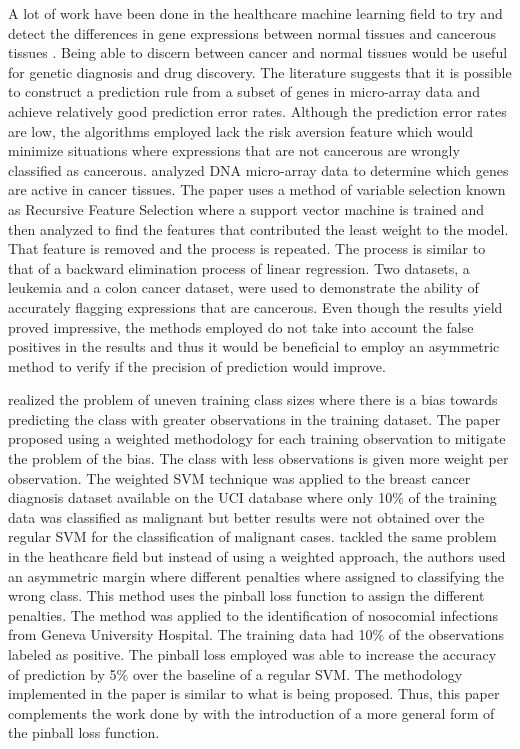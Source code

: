 \documentclass[twoside,11pt]{article}
\begin{document}
A lot of work have been done in the healthcare machine learning field to try and detect the differences in gene expressions between normal tissues and cancerous tissues \citep{Ambroise02}\citep{Guyon02}. Being able to discern between cancer and normal tissues would be useful for genetic diagnosis and drug discovery. The literature suggests that it is possible to construct a prediction rule from a subset of genes in micro-array data and achieve relatively good prediction error rates. Although the prediction error rates are low, the algorithms employed lack the risk aversion feature which would minimize situations where expressions that are not cancerous are wrongly classified as cancerous. \citet{Guyon02} analyzed DNA micro-array data to determine which genes are active in cancer tissues. The paper uses a method of variable selection known as Recursive Feature Selection where a support vector machine is trained and then analyzed to find the features that contributed the least weight to the model. That feature is removed and the process is repeated. The process is similar to that of a backward elimination process of linear regression. Two datasets, a leukemia and a colon cancer dataset, were used to demonstrate the ability of accurately flagging expressions that are cancerous. Even though the results yield proved impressive, the methods employed do not take into account the false positives in the results and thus it would be beneficial to employ an asymmetric method to verify if the precision of prediction would improve.

\citet{Huang05} realized the problem of uneven training class sizes where there is a bias towards predicting the class with greater observations in the training dataset. The paper proposed using a weighted methodology for each training observation to mitigate the problem of the bias. The class with less observations is given more weight per observation. The weighted SVM technique was applied to the breast cancer diagnosis dataset available on the UCI database where only 10\% of the training data was classified as malignant but better results were not obtained over the regular SVM for the classification of malignant cases. \citet{Cohen03} tackled the same problem in the heathcare field but instead of using a weighted approach, the authors used an asymmetric margin where different penalties where assigned to classifying the wrong class. This method uses the pinball loss function to assign the different penalties. The method was applied to the identification of nosocomial infections from Geneva University Hospital. The training data had 10\% of the observations labeled as positive. The pinball loss employed was able to increase the accuracy of prediction by 5\% over the baseline of a regular SVM. The methodology implemented in the paper is similar to what is being proposed. Thus, this paper complements the work done by \citet{Quadrianto09} with the introduction of a more general form of the pinball loss function.
\end{document}
